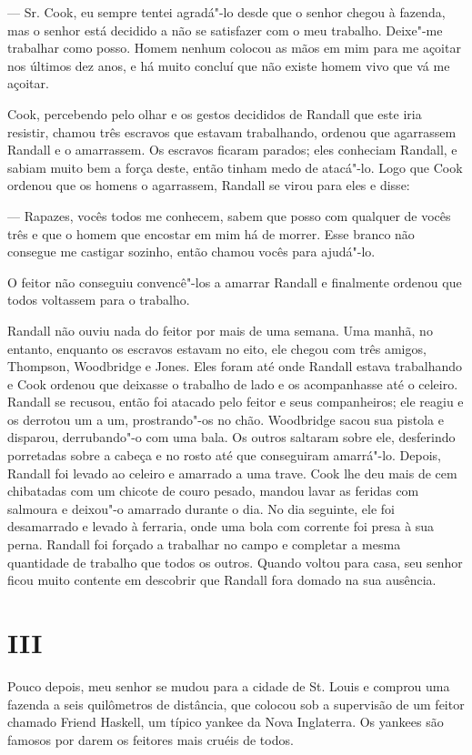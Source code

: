 --- Sr. Cook, eu sempre tentei agradá"-lo desde que o senhor chegou à
fazenda, mas o senhor está decidido a não se satisfazer com o meu
trabalho. Deixe"-me trabalhar como posso. Homem nenhum colocou as mãos em
mim para me açoitar nos últimos dez anos, e há muito concluí que não
existe homem vivo que vá me açoitar.

Cook, percebendo pelo olhar e os gestos decididos de Randall que este
iria resistir, chamou três escravos que estavam trabalhando, ordenou
que agarrassem Randall e o amarrassem. Os escravos ficaram parados; eles
conheciam Randall, e sabiam muito bem a força deste, então tinham medo
de atacá"-lo. Logo que Cook ordenou que os homens o agarrassem, Randall
se virou para eles e disse:

--- Rapazes, vocês todos me conhecem, sabem que posso com qualquer de
vocês três e que o homem que encostar em mim há de morrer. Esse branco
não consegue me castigar sozinho, então chamou vocês para ajudá"-lo.

O feitor não conseguiu convencê"-los a amarrar Randall e finalmente
ordenou que todos voltassem para o trabalho.

Randall não ouviu nada do feitor por mais de uma semana. Uma manhã, no
entanto, enquanto os escravos estavam no eito, ele chegou com três
amigos, Thompson, Woodbridge e Jones. Eles foram até onde Randall estava
trabalhando e Cook ordenou que deixasse o trabalho de lado e os
acompanhasse até o celeiro. Randall se recusou, então foi atacado pelo
feitor e seus companheiros; ele reagiu e os derrotou um a um,
prostrando"-os no chão. Woodbridge sacou sua pistola e disparou,
derrubando"-o com uma bala. Os outros saltaram sobre ele, desferindo
porretadas sobre a cabeça e no rosto até que conseguiram amarrá"-lo.
Depois, Randall foi levado ao celeiro e amarrado a uma trave. Cook lhe
deu mais de cem chibatadas com um chicote de couro pesado, mandou lavar
as feridas com salmoura e deixou"-o amarrado durante o dia. No dia
seguinte, ele foi desamarrado e levado à ferraria, onde uma bola com
corrente foi presa à sua perna. Randall foi forçado a trabalhar no campo
e completar a mesma quantidade de trabalho que todos os outros. Quando
voltou para casa, seu senhor ficou muito contente em descobrir que
Randall fora domado na sua ausência.

\chapter{III}

Pouco depois, meu senhor se mudou para a cidade de St. Louis e comprou
uma fazenda a seis quilômetros de distância, que colocou sob a
supervisão de um feitor chamado Friend Haskell, um típico yankee da Nova
Inglaterra. Os yankees são famosos por darem os feitores mais cruéis de
todos.

